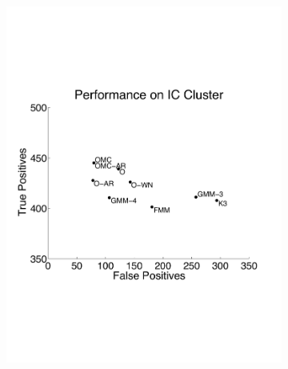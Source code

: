 \begin{center}
\begin{figure}
\begin{subfigure}[b]{.49\textwidth}
\centering
\includegraphics[width=\textwidth]{../figs/clusterperm}
\caption{}
\label{hc1res}
\end{subfigure}
\begin{subfigure}[b]{.49\textwidth}

\end{subfigure}
\end{figure}
\end{center}
